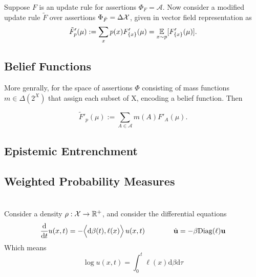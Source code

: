 \documentclass{article}
\begin{document}
Suppose $F$ is an update rule for assertions $\Phi_F = \mathcal A$.
Now consider a modified update rule $\tilde F$ over assertions $\Phi_{\tilde F} = \Delta\mathcal X$, given in vector field representation as
\[
    \tilde F'_p(\mu) := \sum_{x} p(x) F'_{\{x\}}(\mu)
    = \operatorname*{\mathbb{E}}_{x \sim p} [ F'_{\{x\}} (\mu) ].
\]

\subsection{Belief Functions}
More genrally, for the space of assertions $\Phi$ consisting of mass functions $m \in \Delta(2^X)$ that assign each subset of X, encoding a belief function. Then

\[
    \tilde F'_p(\mu) := \sum_{A \in \mathcal A} m(A) F'_{A}(\mu).
\]




\subsection{Epistemic Entrenchment}
\subsection{Weighted Probability Measures}

\section{}
Consider a density $\rho : \mathcal X \to \mathbb R^+$, and consider the differential equations
\[
    \frac{\mathrm d}{\mathrm d t} u(x,t)
    = - \Big\langle\mathrm d\beta(t), \ell(x) \Big\rangle
        \,
        {u(x,t)}
    \qquad\qquad%
    \dot {\mat u} = - \beta \mathrm{Diag}(\ell) \mat u
\]
Which means
\[
        \log u (x,t)
    = \int_{0}^{t}  \ell(x) \mathrm d \beta \mathrm d \tau
\]





\end{document}
